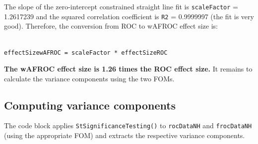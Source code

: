 \documentclass[
]{book}
\newenvironment{Shaded}{\begin{snugshade}}{\end{snugshade}}
\newcommand{\AttributeTok}[1]{\textcolor[rgb]{0.77,0.63,0.00}{#1}}
\newcommand{\CommentTok}[1]{\textcolor[rgb]{0.56,0.35,0.01}{\textit{#1}}}
\newcommand{\DecValTok}[1]{\textcolor[rgb]{0.00,0.00,0.81}{#1}}
\newcommand{\FloatTok}[1]{\textcolor[rgb]{0.00,0.00,0.81}{#1}}
\newcommand{\FunctionTok}[1]{\textcolor[rgb]{0.00,0.00,0.00}{#1}}
\newcommand{\NormalTok}[1]{#1}
\newcommand{\OtherTok}[1]{\textcolor[rgb]{0.56,0.35,0.01}{#1}}
\newcommand{\SpecialCharTok}[1]{\textcolor[rgb]{0.00,0.00,0.00}{#1}}
\newcommand{\StringTok}[1]{\textcolor[rgb]{0.31,0.60,0.02}{#1}}
\begin{document}
\begin{Shaded}
\end{Shaded}

The slope of the zero-intercept constrained straight line fit is \texttt{scaleFactor} = 1.2617239 and the squared correlation coefficient is \texttt{R2} = 0.9999997 (the fit is very good). Therefore, the conversion from ROC to wAFROC effect size is:

\begin{verbatim}

effectSizewAFROC = scaleFactor * effectSizeROC
\end{verbatim}

\textbf{The wAFROC effect size is 1.26 times the ROC effect size.} It remains to calculate the variance components using the two FOMs.

\hypertarget{computing-variance-components}{%
\subsection{Computing variance components}\label{computing-variance-components}}

The code block applies \texttt{StSignificanceTesting()} to \texttt{rocDataNH} and \texttt{frocDataNH} (using the appropriate FOM) and extracts the respective variance components.

\begin{Shaded}
\end{Shaded}
\end{document}
